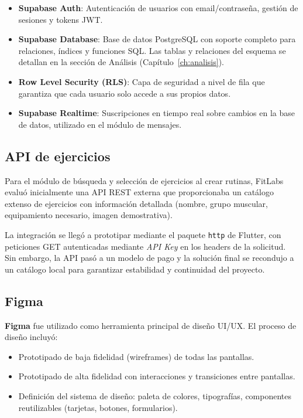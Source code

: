 \begin{itemize}
  \item \textbf{Supabase Auth}: Autenticación de usuarios con email/contraseña, gestión de sesiones y tokens JWT.
  \item \textbf{Supabase Database}: Base de datos PostgreSQL con soporte completo para relaciones, índices y funciones SQL. Las tablas y relaciones del esquema se detallan en la sección de Análisis (Capítulo~\ref{ch:analisis}).
  \item \textbf{Row Level Security (RLS)}: Capa de seguridad a nivel de fila que garantiza que cada usuario solo accede a sus propios datos.
  \item \textbf{Supabase Realtime}: Suscripciones en tiempo real sobre cambios en la base de datos, utilizado en el módulo de mensajes.
\end{itemize}

\subsection{API de ejercicios}

Para el módulo de búsqueda y selección de ejercicios al crear rutinas, FitLabs evaluó inicialmente una API REST externa que proporcionaba un catálogo extenso de ejercicios con información detallada (nombre, grupo muscular, equipamiento necesario, imagen demostrativa).

La integración se llegó a prototipar mediante el paquete \texttt{http} de Flutter, con peticiones GET autenticadas mediante \textit{API Key} en los headers de la solicitud. Sin embargo, la API pasó a un modelo de pago y la solución final se recondujo a un catálogo local para garantizar estabilidad y continuidad del proyecto.

\subsection{Figma}

\textbf{Figma} fue utilizado como herramienta principal de diseño UI/UX. El proceso de diseño incluyó:

\begin{itemize}
  \item Prototipado de baja fidelidad (wireframes) de todas las pantallas.
  \item Prototipado de alta fidelidad con interacciones y transiciones entre pantallas.
  \item Definición del sistema de diseño: paleta de colores, tipografías, componentes reutilizables (tarjetas, botones, formularios).
\end{itemize}

